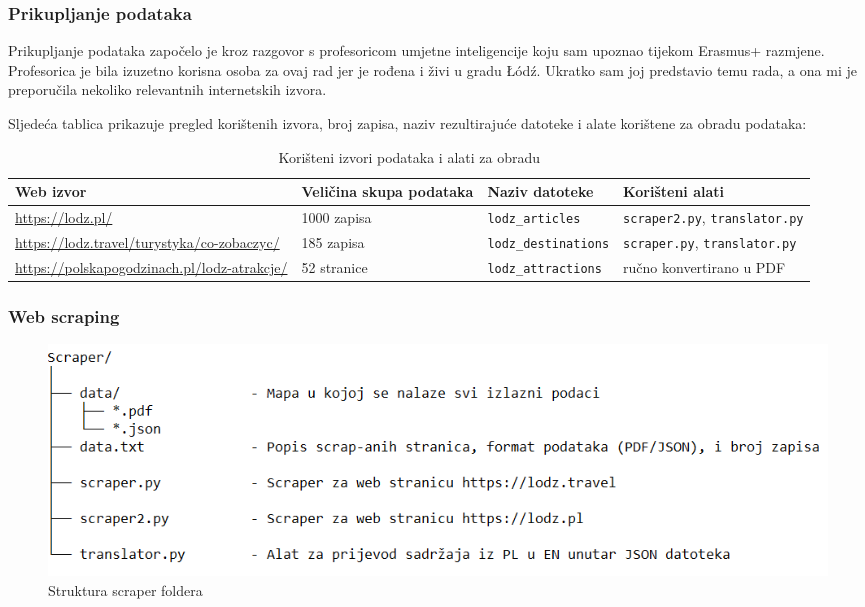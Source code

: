 \documentclass[]{foi}
\begin{document}
\subsubsection{Prikupljanje podataka}

Prikupljanje podataka započelo je kroz razgovor s profesoricom umjetne inteligencije koju sam upoznao tijekom Erasmus+ razmjene. 
Profesorica je bila izuzetno korisna osoba za ovaj rad jer je rođena i živi u gradu Łódź. Ukratko sam joj predstavio temu rada, 
a ona mi je preporučila nekoliko relevantnih internetskih izvora.

Sljedeća tablica prikazuje pregled korištenih izvora, broj zapisa, naziv rezultirajuće datoteke i alate korištene za obradu podataka:

\begin{table}[H]
\centering
\begin{tabular}{|p{4cm}|p{3.5cm}|p{5cm}|p{3.5cm}|}
\hline
\textbf{Web izvor} & \textbf{Veličina skupa podataka} & \textbf{Naziv datoteke} & \textbf{Korišteni alati} \\
\hline
\url{https://lodz.pl/} & 1000 zapisa & \raggedright\texttt{lodz\_articles} & \texttt{scraper2.py}, \texttt{translator.py} \\
\hline
\url{https://lodz.travel/turystyka/co-zobaczyc/} & 185 zapisa & \raggedright\texttt{lodz\_destinations} & \texttt{scraper.py}, \texttt{translator.py} \\
\hline
\url{https://polskapogodzinach.pl/lodz-atrakcje/} & 52 stranice & \raggedright\texttt{lodz\_attractions} & ručno konvertirano u PDF \\
\hline
\end{tabular}
\caption{Korišteni izvori podataka i alati za obradu}
\label{tab:izvori}
\end{table}



\subsubsection{Web scraping}
\begin{figure}[ht!]
    \centering
    \includegraphics[width=1\textwidth]{./assets/structure-scraper.png}
    \caption{Struktura scraper foldera}
    \label{fig:slika1111}
\end{figure}
\end{document}
